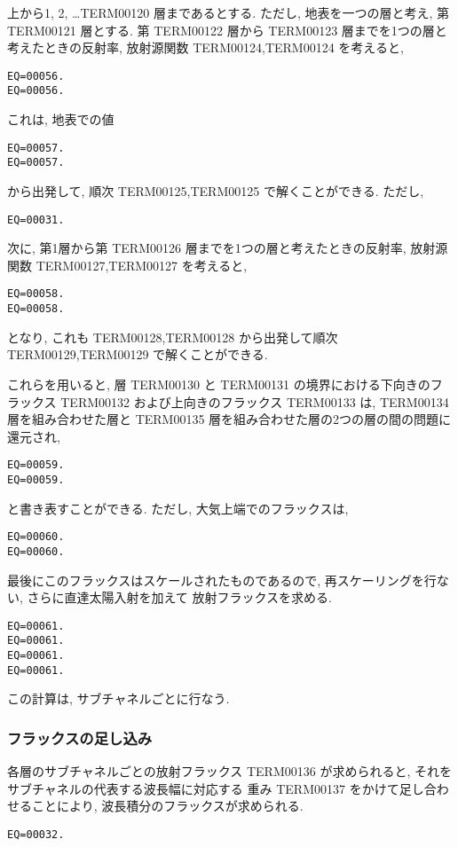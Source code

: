 上から1, 2, \ldots TERM00120 層まであるとする. 
ただし, 地表を一つの層と考え, 第 TERM00121 層とする.
第 TERM00122 層から TERM00123 層までを1つの層と考えたときの反射率, 放射源関数
TERM00124,TERM00124 を考えると,
\begin{verbatim}
EQ=00056.
EQ=00056.
\end{verbatim}
これは, 地表での値
\begin{verbatim}
EQ=00057.
EQ=00057.
\end{verbatim}
から出発して, 順次 TERM00125,TERM00125 で解くことができる.
ただし,
\begin{verbatim}
EQ=00031.
\end{verbatim}


次に, 第1層から第 TERM00126 層までを1つの層と考えたときの反射率, 放射源関数
TERM00127,TERM00127 を考えると,
\begin{verbatim}
EQ=00058.
EQ=00058.
\end{verbatim}
となり, これも TERM00128,TERM00128
から出発して順次 TERM00129,TERM00129 で解くことができる.

これらを用いると,
層 TERM00130 と TERM00131 の境界における下向きのフラックス TERM00132
および上向きのフラックス TERM00133 は,
TERM00134 層を組み合わせた層と
TERM00135 層を組み合わせた層の2つの層の間の問題に還元され,
\begin{verbatim}
EQ=00059.
EQ=00059.
\end{verbatim}
と書き表すことができる.
ただし, 大気上端でのフラックスは,
\begin{verbatim}
EQ=00060.
EQ=00060.
\end{verbatim}

最後にこのフラックスはスケールされたものであるので,
再スケーリングを行ない, さらに直達太陽入射を加えて
放射フラックスを求める.

\begin{verbatim}
EQ=00061.
EQ=00061.
EQ=00061.
EQ=00061.
\end{verbatim}

この計算は, サブチャネルごとに行なう.

\subsubsection{フラックスの足し込み}

各層のサブチャネルごとの放射フラックス TERM00136 が求められると,
それをサブチャネルの代表する波長幅に対応する
重み TERM00137 をかけて足し合わせることにより,
波長積分のフラックスが求められる.

\begin{verbatim}
EQ=00032.
\end{verbatim}

